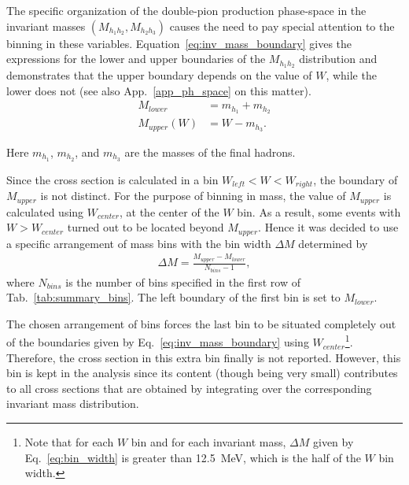 The specific organization of the double-pion production phase-space in the invariant masses $(M_{h_{1}h_{2}}, M_{h_{2}h_{3}})$ causes the need to pay special attention to the binning in these variables. Equation~\eqref{eq:inv_mass_boundary} gives the expressions for the lower and upper boundaries of the $M_{h_{1}h_{2}}$ distribution and demonstrates that the upper boundary depends on the value of $W$, while the lower does not (see also App.~\ref{app_ph_space} on this matter).
\begin{equation}
\begin{aligned}
M_{lower} &= m_{h_1} + m_{h_2} \\
M_{upper} (W) &= W - m_{h_3}. \label{eq:inv_mass_boundary}
\end{aligned}  
\end{equation}

Here $m_{h_1}$, $m_{h_2}$, and $m_{h_3}$ are the masses of the final hadrons. 


Since the cross section is calculated in a bin $W_{left} < W < W_{right}$, the boundary of $M_{upper}$ is not distinct. For the purpose of binning in mass, the value of $M_{upper}$ is calculated using $W_{center}$, at the center of the $W$ bin. As a result, some events with $W > W_{center}$ turned out to be located beyond $M_{upper}$. Hence it was decided to use a specific arrangement of mass bins with the bin width $\Delta M$ determined by
\begin{equation}
\begin{aligned}
\Delta M = \frac{M_{upper}-M_{lower}}{N_{bins}-1}, \label{eq:bin_width}
\end{aligned}  
\end{equation} 
where $N_{bins}$ is the number of bins specified in the first row of Tab.~\ref{tab:summary_bins}. The left boundary of the first bin is set to $M_{lower}$.

The chosen arrangement of bins forces the last bin to be situated completely out of the boundaries given by Eq.~\eqref{eq:inv_mass_boundary} using $W_{center}$\footnote[9]{Note that for each $W$ bin and for each invariant mass, $\Delta M$ given by Eq.~\eqref{eq:bin_width} is greater than 12.5~MeV, which is the half of the $W$ bin width.}. Therefore, the cross section in this extra bin finally is not reported. However, this bin is kept in the analysis since its content (though being very small) contributes to all cross sections that are obtained by integrating over the corresponding invariant mass distribution. 


